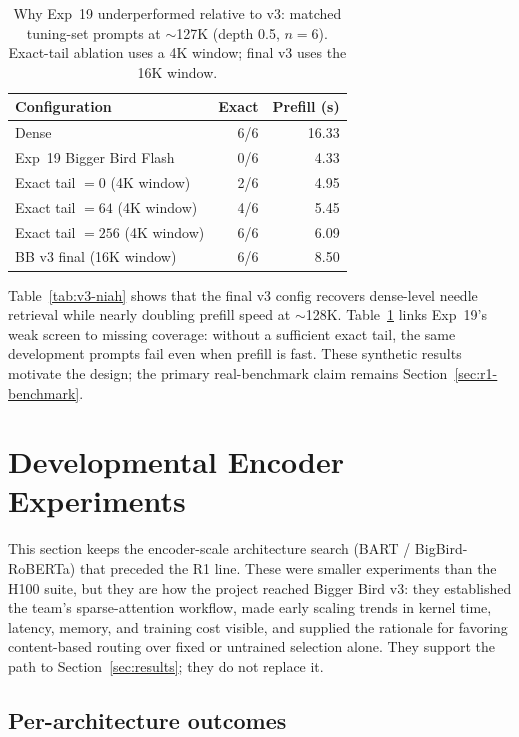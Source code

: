 \documentclass[11pt]{article}
\begin{document}
\begin{table}[ht]
  \centering
  \small
  \caption{Why Exp~19 underperformed relative to v3: matched tuning-set
  prompts at $\sim$127K (depth 0.5, $n{=}6$). Exact-tail ablation uses a 4K
  window; final v3 uses the 16K window.}
  \label{tab:v3-ablate}
  \begin{tabular}{@{}lrr@{}}
    \toprule
    Configuration & Exact & Prefill (s) \\
    \midrule
    Dense & 6/6 & 16.33 \\
    Exp~19 Bigger Bird Flash & 0/6 & 4.33 \\
    Exact tail $=0$ (4K window) & 2/6 & 4.95 \\
    Exact tail $=64$ (4K window) & 4/6 & 5.45 \\
    Exact tail $=256$ (4K window) & 6/6 & 6.09 \\
    BB v3 final (16K window) & 6/6 & 8.50 \\
    \bottomrule
  \end{tabular}
\end{table}

Table~\ref{tab:v3-niah} shows that the final v3 config recovers dense-level
needle retrieval while nearly doubling prefill speed at $\sim$128K.
Table~\ref{tab:v3-ablate} links Exp~19's weak screen to missing coverage:
without a sufficient exact tail, the same development prompts fail even when
prefill is fast. These synthetic results motivate the design; the primary
real-benchmark claim remains Section~\ref{sec:r1-benchmark}.


\section{Developmental Encoder Experiments}
\label{sec:developmental}

This section keeps the encoder-scale architecture search (BART /
BigBird-RoBERTa) that preceded the R1 line. These were smaller experiments
than the H100 suite, but they are how the project reached Bigger Bird v3:
they established the team's sparse-attention workflow, made early scaling
trends in kernel time, latency, memory, and training cost visible, and
supplied the rationale for favoring content-based routing over fixed or
untrained selection alone. They support the path to Section~\ref{sec:results};
they do not replace it.

\subsection{Per-architecture outcomes}
\end{document}
